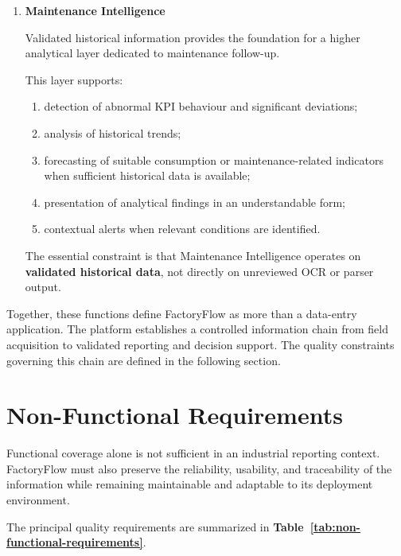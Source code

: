 \begin{enumerate}[label=\textbf{\arabic*.}]
    \item \textbf{Maintenance Intelligence}

    Validated historical information provides the foundation for a higher
    analytical layer dedicated to maintenance follow-up.

    This layer supports:
    \begin{enumerate}[label=\textbf{\arabic{enumi}.\arabic*.}]
        \item detection of abnormal KPI behaviour and significant deviations;
        \item analysis of historical trends;
        \item forecasting of suitable consumption or maintenance-related
        indicators when sufficient historical data is available;
        \item presentation of analytical findings in an understandable form;
        \item contextual alerts when relevant conditions are identified.
    \end{enumerate}

    The essential constraint is that Maintenance Intelligence operates on
    \textbf{validated historical data}, not directly on unreviewed OCR or
    parser output.

\end{enumerate}

Together, these functions define FactoryFlow as more than a data-entry
application. The platform establishes a controlled information chain from
field acquisition to validated reporting and decision support. The quality
constraints governing this chain are defined in the following section.



\section{Non-Functional Requirements}
\label{sec:non-functional-requirements}

Functional coverage alone is not sufficient in an industrial reporting
context. FactoryFlow must also preserve the reliability, usability, and
traceability of the information while remaining maintainable and adaptable to
its deployment environment.

The principal quality requirements are summarized in
\textbf{Table~\ref{tab:non-functional-requirements}}.

